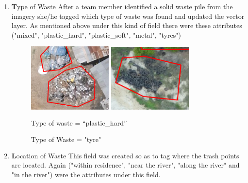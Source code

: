 \documentclass[a4paper,12pt,twoside]{article}
\begin{document}
         \begin{enumerate}
            \item \textbf Type of Waste
            After a team member identified a solid waste pile from the imagery she/he tagged which type of waste was found and updated the vector layer. As mentioned above under this kind of field there were these attributes ("mixed", "plastic_hard", "plastic_soft", "metal", "tyres")
            
                \begin{figure} %
                    \centering
                    \includegraphics[width=0.4\textwidth]{images/image19.png}
                    \includegraphics[width=0.4\textwidth]{images/image3.png}
                    \caption{Type of waste = “plastic_hard”}
                    \caption{Type of Waste = "tyre"}
                \end{figure}
                
            \item \textbf Location of Waste
            This field was created so as to tag where the trash points are located. Again ("within residence", "near the river", "along the river" and "in the river") were the attributes under this field.
                

\end{enumerate}
\end{document}

